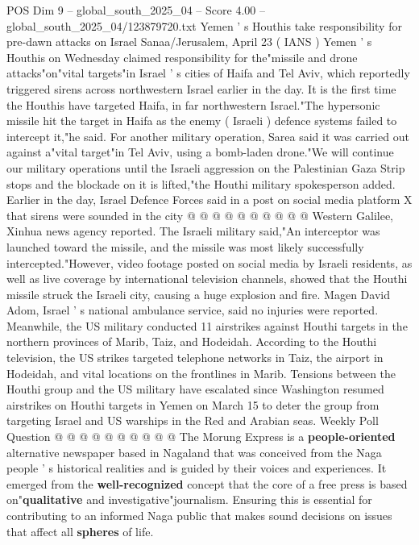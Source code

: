 \begin{textsample}{POS Dim 9 – global\_south\_2025\_04 – Score 4.00 – global\_south\_2025\_04/123879720.txt}  \label{ex:f9_pos_183}
Yemen ' s Houthis take responsibility for pre-dawn attacks on Israel Sanaa/Jerusalem, April 23 ( IANS ) Yemen ' s Houthis on Wednesday claimed responsibility for the"missile and drone attacks"on"vital targets"in Israel ' s cities of Haifa and Tel Aviv, which reportedly triggered sirens across northwestern Israel earlier in the day.
It is the first time the Houthis have targeted Haifa, in far northwestern Israel."The hypersonic missile hit the target in Haifa as the enemy ( Israeli ) defence systems failed to intercept it,"he said.
For another military operation, Sarea said it was carried out against a"vital target"in Tel Aviv, using a bomb-laden drone."We will continue our military operations until the Israeli aggression on the Palestinian Gaza Strip stops and the blockade on it is lifted,"the Houthi military spokesperson added.
Earlier in the day, Israel Defence Forces said in a post on social media platform X that sirens were sounded in the city @ @ @ @ @ @ @ @ @ @ Western Galilee, Xinhua news agency reported.
The Israeli military said,"An interceptor was launched toward the missile, and the missile was most likely successfully intercepted."However, video footage posted on social media by Israeli residents, as well as live coverage by international television channels, showed that the Houthi missile struck the Israeli city, causing a huge explosion and fire.
Magen David Adom, Israel ' s national ambulance service, said no injuries were reported.
Meanwhile, the US military conducted 11 airstrikes against Houthi targets in the northern provinces of Marib, Taiz, and Hodeidah.
According to the Houthi television, the US strikes targeted telephone networks in Taiz, the airport in Hodeidah, and vital locations on the frontlines in Marib.
Tensions between the Houthi group and the US military have escalated since Washington resumed airstrikes on Houthi targets in Yemen on March 15 to deter the group from targeting Israel and US warships in the Red and Arabian seas.
Weekly Poll Question @ @ @ @ @ @ @ @ @ @ The Morung Express is a \textbf{people-oriented} alternative newspaper based in Nagaland that was conceived from the Naga people ' s historical realities and is guided by their voices and experiences.
It emerged from the \textbf{well-recognized} concept that the core of a free press is based on"\textbf{qualitative} and investigative"journalism.
Ensuring this is essential for contributing to an informed Naga public that makes sound decisions on issues that affect all \textbf{spheres} of life.

\end{textsample}
